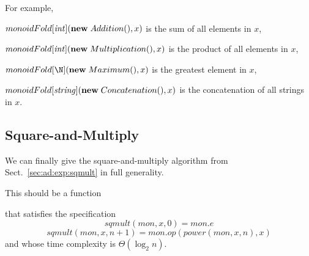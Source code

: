 For example,
\begin{compactitem}
\item $monoidFold[\mathit{int}]({\rm \bf new}\; Addition(), x)$ is the sum of all elements in $x$,
\item $monoidFold[\mathit{int}]({\rm \bf new}\; Multiplication(), x)$ is the product of all elements in $x$,
\item $monoidFold[\N](\anew{Maximum}{}, x)$ is the greatest element in $x$,
\item $monoidFold[\mathit{string}]({\rm \bf new}\; Concatenation(), x)$ is the concatenation of all strings in $x$.
\end{compactitem}

\subsection{Square-and-Multiply}

We can finally give the square-and-multiply algorithm from Sect.~\ref{sec:ad:exp:sqmult} in full generality.

This should be a function
\begin{acode}
\end{acode}
that satisfies the specification
\[sqmult(mon, x, 0)=mon.e\]
\[sqmult(mon, x, n+1)=mon.op(power(mon, x, n), x)\]
and whose time complexity is $\Theta(\log_2 n)$.

